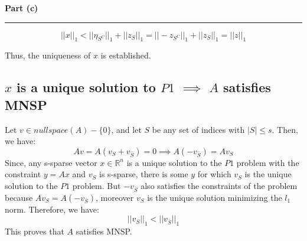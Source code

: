 \documentclass[a4paper,12pt]{article}
\newenvironment{solution}[2][]{%
    \begin{mdframed}[linecolor=blue!70!black, linewidth=2pt, roundcorner=10pt, backgroundcolor=yellow!10!white, skipabove=12pt, skipbelow=12pt]%
        \textbf{\large #2}
        \par\noindent\rule{\textwidth}{0.4pt}
}{
    \end{mdframed}
}
\begin{document}
\begin{solution}{Part (c)}
  \[
  ||x||_1 < ||\eta_{S^C}||_1 + ||z_S||_1 = ||-z_{S^C}||_1 + ||z_S||_1 = ||z||_1
  \]

  Thus, the uniqueness of $x$ is established.

  \subsection*{$x$ is a unique solution to $P1$ $\implies$ $A$ satisfies MNSP}
  Let $v \in nullspace(A) - \{0\}$, and let $S$ be any set of indices with $|S| \leq s$. Then, we have:
  \[
  Av = A(v_S + v_{\bar{S}}) = 0 \implies A(-v_{\bar{S}}) = Av_S
  \]
  Since, any s-sparse vector $x \in \mathbb{R}^n$ is a unique solution to the $P1$ problem with the constraint $y = Ax$ and $v_S$ is s-sparse, there is some $y$ for which $v_S$ is the unique solution to the $P1$ problem. But $-v_{\bar{S}}$ also satisfies the constraints of the problem because $Av_S = A(-v_{\bar{S}})$, moreover $v_S$ is the unique solution minimizing the $l_1$ norm. Therefore, we have:
  \[
  ||v_S||_1 < ||v_{\bar{S}}||_1
  \]
  This proves that $A$ satisfies MNSP.  
\end{solution}
\end{document}
